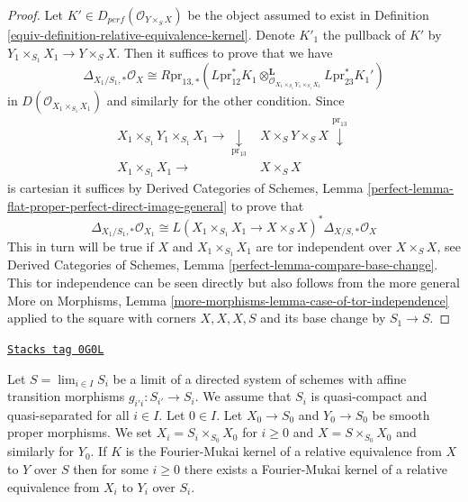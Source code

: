 \begin{proof}

Let $K' \in D_{perf}(\mathcal{O}_{Y \times_S X})$ be the object assumed to
exist in Definition \ref{equiv-definition-relative-equivalence-kernel}.
Denote $K'_1$ the pullback of $K'$ by
$Y_1 \times_{S_1} X_1 \to Y \times_S X$.
Then it suffices to prove that we have
$$
\Delta_{X_1/S_1, *}\mathcal{O}_X \cong
R\text{pr}_{13, *}(L\text{pr}_{12}^*K_1
\otimes_{\mathcal{O}_{X_1 \times_{S_1} Y_1 \times_{S_1} X_1}}^\mathbf{L}
L\text{pr}_{23}^*K_1')
$$
in $D(\mathcal{O}_{X_1 \times_{S_1} X_1})$ and similarly for the other
condition. Since
$$
\begin{array}{cc}X_1 \times_{S_1} Y_1 \times_{S_1} X_1 \longrightarrow\underset{\text{pr}_{13}}{\downarrow} & X \times_S Y \times_S X \overset{\text{pr}_{13}}{\downarrow} \\ X_1 \times_{S_1} X_1 \longrightarrow & X \times_S X\end{array}
$$
is cartesian it suffices by Derived Categories of Schemes, Lemma
\ref{perfect-lemma-flat-proper-perfect-direct-image-general}
to prove that
$$
\Delta_{X_1/S_1, *}\mathcal{O}_{X_1}
\cong
L(X_1 \times_{S_1} X_1 \to X \times_S X)^*\Delta_{X/S, *}\mathcal{O}_X
$$
This in turn will be true if $X$ and $X_1 \times_{S_1} X_1$ are tor
independent over $X \times_S X$, see
Derived Categories of Schemes, Lemma \ref{perfect-lemma-compare-base-change}.
This tor independence can be seen directly but also follows from
the more general More on Morphisms, Lemma
\ref{more-morphisms-lemma-case-of-tor-independence} applied to the square
with corners $X, X, X, S$ and its base change by $S_1 \to S$.
\end{proof}

\begin{lemma}
\label{equiv-lemma-descend-rek}
\href{https://stacks.math.columbia.edu/tag/0G0L}{\texttt{Stacks tag 0G0L}}

Let $S = \lim_{i \in I} S_i$ be a limit of a directed system of schemes
with affine transition morphisms $g_{i'i} : S_{i'} \to S_i$.
We assume that $S_i$ is quasi-compact and quasi-separated for all $i \in I$.
Let $0 \in I$. Let $X_0 \to S_0$ and $Y_0 \to S_0$ be smooth proper morphisms.
We set $X_i = S_i \times_{S_0} X_0$ for $i \geq 0$
and $X = S \times_{S_0} X_0$ and similarly for $Y_0$. If $K$ is the
Fourier-Mukai kernel of a relative equivalence from $X$ to $Y$ over $S$
then for some $i \geq 0$ there exists a
Fourier-Mukai kernel of a relative equivalence from $X_i$ to $Y_i$ over $S_i$.
\end{lemma}


